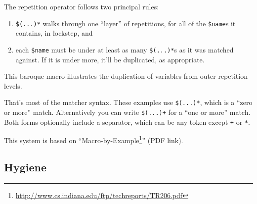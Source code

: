\documentclass[a4paper,]{book}
\newenvironment{Shaded}{\begin{snugshade}}{\end{snugshade}}
\newcommand{\KeywordTok}[1]{\textcolor[rgb]{0.13,0.29,0.53}{\textbf{{#1}}}}
\newcommand{\DecValTok}[1]{\textcolor[rgb]{0.00,0.00,0.81}{{#1}}}
\newcommand{\OtherTok}[1]{\textcolor[rgb]{0.56,0.35,0.01}{{#1}}}
\newcommand{\NormalTok}[1]{{#1}}
\renewcommand{\href}[2]{#2\footnote{\url{#1}}}
\begin{document}
The repetition operator follows two principal rules:

\begin{enumerate}
\def\labelenumi{\arabic{enumi}.}
\itemsep1pt\parskip0pt
\item
  \texttt{\$(...)*} walks through one ``layer'' of repetitions, for all
  of the \texttt{\$name}s it contains, in lockstep, and
\item
  each \texttt{\$name} must be under at least as many \texttt{\$(...)*}s
  as it was matched against. If it is under more, it'll be duplicated,
  as appropriate.
\end{enumerate}

This baroque macro illustrates the duplication of variables from outer
repetition levels.

\begin{Shaded}
\end{Shaded}

That's most of the matcher syntax. These examples use \texttt{\$(...)*},
which is a ``zero or more'' match. Alternatively you can write
\texttt{\$(...)+} for a ``one or more'' match. Both forms optionally
include a separator, which can be any token except \texttt{+} or
\texttt{*}.

This system is based on
``\href{http://www.cs.indiana.edu/ftp/techreports/TR206.pdf}{Macro-by-Example}''
(PDF link).

\subsection{Hygiene}\label{hygiene}
\end{document}
